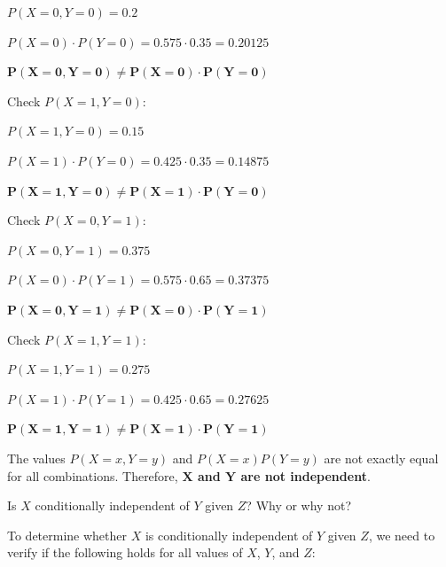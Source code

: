 \documentclass[12pt,letterpaper, onecolumn]{exam}
\begin{document}
\begin{questions}
\begin{parts}
\begin{subparts}
\begin{solution}
                \begin{center}
                    $P(X=0,Y=0) = 0.2$

                    $P(X=0) \cdot P(Y=0) = 0.575 \cdot 0.35 = 0.20125$

                    $\boldsymbol{P(X=0,Y=0) \neq P(X=0) \cdot P(Y=0)}$
                \end{center}

                Check $P(X=1,Y=0)$:

                \begin{center}
                    $P(X=1,Y=0) = 0.15$

                    $P(X=1) \cdot P(Y=0) = 0.425 \cdot 0.35 = 0.14875$

                    $\boldsymbol{P(X=1,Y=0) \neq P(X=1) \cdot P(Y=0)}$
                \end{center}

                Check $P(X=0,Y=1)$:

                \begin{center}
                    $P(X=0,Y=1) = 0.375$

                    $P(X=0) \cdot P(Y=1) = 0.575 \cdot 0.65 = 0.37375$

                    $\boldsymbol{P(X=0,Y=1) \neq P(X=0) \cdot P(Y=1)}$
                \end{center}

                Check $P(X=1,Y=1)$:

                \begin{center}
                    $P(X=1,Y=1) = 0.275$

                    $P(X=1) \cdot P(Y=1) = 0.425 \cdot 0.65 = 0.27625$

                    $\boldsymbol{P(X=1,Y=1) \neq P(X=1) \cdot P(Y=1)}$
                \end{center}

                The values $P(X=x,Y=y)$ and $P(X=x)P(Y=y)$ are not exactly equal for all combinations. 
                Therefore, \textbf{$\boldsymbol{X}$ and $\textbf{Y}$ are not independent}.
                
            \end{solution}

            \pagebreak

            \subpart[5]
            Is $X$ conditionally independent of $Y$ given $Z$? Why or why not?
    
            \begin{solution}
                To determine whether $X$ is conditionally independent of $Y$ given 
                $Z$, we need to verify if the following holds for all values of 
                $X$, $Y$, and $Z$:
                

\end{solution}
\end{subparts}
\end{parts}
\end{questions}
\end{document}
